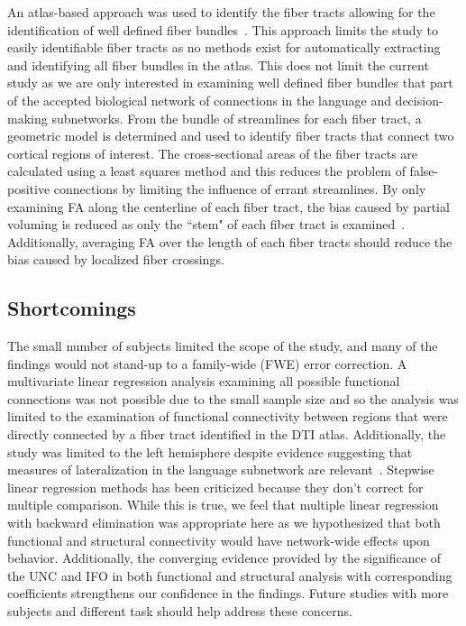An atlas-based approach was used to identify the fiber tracts allowing for the identification of well defined fiber bundles~\cite{Yushkevich2008}. This approach limits the study to easily identifiable fiber tracts as no methods exist for automatically extracting and identifying all fiber bundles in the atlas. This does not limit the current study as we are only interested in examining well defined fiber bundles that part of the accepted biological network of connections in the language and decision-making subnetworks. From the bundle of streamlines for each fiber tract, a geometric model is determined and used to identify fiber tracts that connect two cortical regions of interest. The cross-sectional areas of the fiber tracts are calculated using a least squares method and this reduces the problem of false-positive connections by limiting the influence of errant streamlines. By only examining FA along the centerline of each fiber tract, the bias caused by partial voluming is reduced as only the ``stem" of each fiber tract is examined~\cite{Smith2006,Yushkevich2008}. Additionally, averaging FA over the length of each fiber tracts should reduce the bias caused by localized fiber crossings.

\subsection{Shortcomings}
The small number of subjects limited the scope of the study, and many of the findings would not stand-up to a family-wide (FWE) error correction. A multivariate linear regression analysis examining all possible functional connections was not possible due to the small sample size and so the analysis was limited to the examination of functional connectivity between regions that were directly connected by a fiber tract identified in the DTI atlas. Additionally, the study was limited to the left hemisphere despite evidence suggesting that measures of lateralization in the language subnetwork are relevant~\cite{Catani2007,Powell2006,Putnam2008,Propper2010}. Stepwise linear regression methods has been criticized because they don't correct for multiple comparison. While this is true, we feel that multiple linear regression with backward elimination was appropriate here as we hypothesized that both functional and structural connectivity would have network-wide effects upon behavior. Additionally, the converging evidence provided by the significance of the UNC and IFO in both functional and structural analysis with corresponding coefficients strengthens our confidence in the findings. Future studies with more subjects and different task should help address these concerns.

